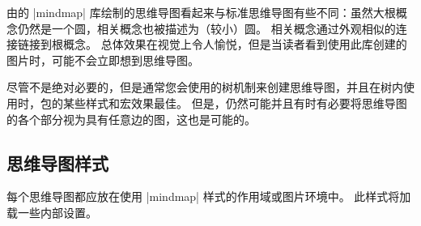 由\tikzname 的 |mindmap| 库绘制的思维导图看起来与标准思维导图有些不同：虽然大根概念仍然是一个圆，相关概念也被描述为（较小）圆。 相关概念通过外观相似的连接链接到根概念。 总体效果在视觉上令人愉悦，但是当读者看到使用此库创建的图片时，可能不会立即想到思维导图。


尽管不是绝对必要的，但是通常您会使用\tikzname 的树机制来创建思维导图，并且在树内使用时，包的某些样式和宏效果最佳。 但是，仍然可能并且有时有必要将思维导图的各个部分视为具有任意边的图，这也是可能的。


\subsection{思维导图样式}


每个思维导图都应放在使用 |mindmap| 样式的作用域或图片环境中。 此样式将加载一些内部设置。

